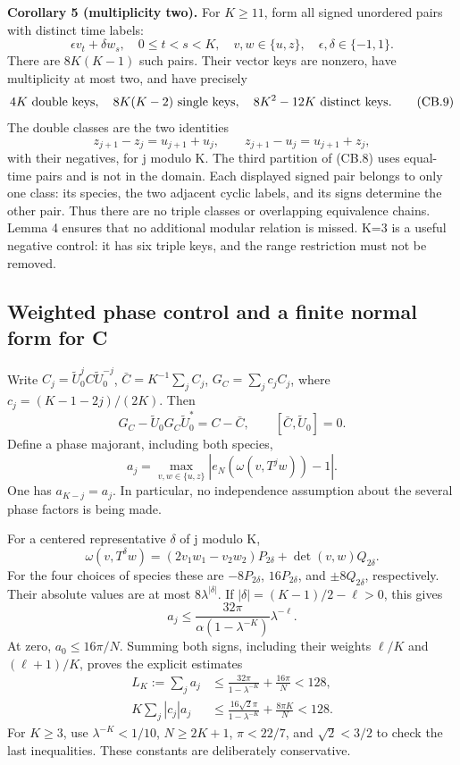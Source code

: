 \textbf{Corollary 5 (multiplicity two).} For \(K\geq11\), form all signed unordered pairs with distinct time labels: \[
 \epsilon v_t+\delta w_s,
 \quad 0\leq t<s<K,\quad v,w\in\{u,z\},\quad
 \epsilon,\delta\in\{-1,1\}.
\] There are \(8K(K-1)\) such pairs. Their vector keys are nonzero, have multiplicity at most two, and have precisely \[
 4K\ \hbox{double keys},\quad 8K(K-2)\ \hbox{single keys},
 \quad 8K^2-12K\ \hbox{distinct keys}.                          \tag{CB.9}
\] The double classes are the two identities \[
 z_{j+1}-z_j=u_{j+1}+u_j,\qquad
 z_{j+1}-u_j=u_{j+1}+z_j,
\] with their negatives, for j modulo K. The third partition of (CB.8) uses equal-time pairs and is not in the domain. Each displayed signed pair belongs to only one class: its species, the two adjacent cyclic labels, and its signs determine the other pair. Thus there are no triple classes or overlapping equivalence chains. Lemma 4 ensures that no additional modular relation is missed. K=3 is a useful negative control: it has six triple keys, and the range restriction must not be removed.

\subsection{Weighted phase control and a finite normal form for C}\label{coboundary:weighted-phase-control-and-a-finite-normal-form-for-c}

Write \(C_j=\widetilde U_0^jC\widetilde U_0^{-j}\), \(\bar C=K^{-1}\sum_j C_j\), \(G_C=\sum_j c_jC_j\), where \(c_j=(K-1-2j)/(2K)\). Then \[
 G_C-\widetilde U_0G_C\widetilde U_0^*=C-\bar C,\qquad [\bar C,\widetilde U_0]=0.                \tag{CB.10}
\] Define a phase majorant, including both species, \[
 a_j=\max_{v,w\in\{u,z\}}
          |e_N(\omega(v,T^jw))-1|.
\] One has \(a_{K-j}=a_j\). In particular, no independence assumption about the several phase factors is being made.

For a centered representative \(\delta\) of j modulo K, \[
 \omega(v,T^\delta w)
 =(2v_1w_1-v_2w_2)P_{2\delta}+\det(v,w)Q_{2\delta}.
\] For the four choices of species these are \(-8P_{2\delta}\), \(16P_{2\delta}\), and \(\pm8Q_{2\delta}\), respectively. Their absolute values are at most \(8\lambda^{|\delta|}\). If \(|\delta|=(K-1)/2-\ell>0\), this gives \[
 a_j\leq\frac{32\pi}{\alpha(1-\lambda^{-K})}\lambda^{-\ell}.
\] At zero, \(a_0\leq16\pi/N\). Summing both signs, including their weights \(\ell/K\) and \((\ell+1)/K\), proves the explicit estimates \[
 \begin{split}
 L_K:=\sum_j a_j
   &\leq\frac{32\pi}{1-\lambda^{-K}}+\frac{16\pi}{N}<128,\\
 K\sum_j|c_j|a_j
   &\leq\frac{16\sqrt2\pi}{1-\lambda^{-K}}+
                                      \frac{8\pi K}{N}<128.
 \end{split}                                                    \tag{CB.11}
\] For \(K\geq3\), use \(\lambda^{-K}<1/10\), \(N\geq2K+1\), \(\pi<22/7\), and \(\sqrt2<3/2\) to check the last inequalities. These constants are deliberately conservative.

